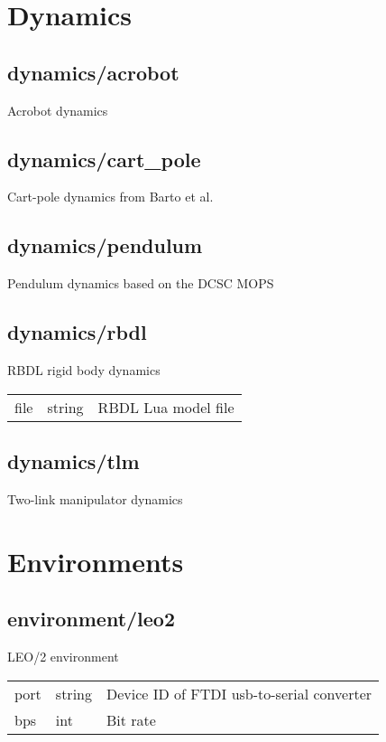 \section{Dynamics}
\subsection{dynamics/acrobot}
\noindent Acrobot dynamics\\

\subsection{dynamics/cart\_pole}
\noindent Cart-pole dynamics from Barto et al.\\

\subsection{dynamics/pendulum}
\noindent Pendulum dynamics based on the DCSC MOPS\\

\subsection{dynamics/rbdl}
\noindent RBDL rigid body dynamics\\

\noindent\begin{tabular}{@{}lll@{}}
file&string&RBDL Lua model file\\
\end{tabular}
\subsection{dynamics/tlm}
\noindent Two-link manipulator dynamics\\

\section{Environments}
\subsection{environment/leo2}
\noindent LEO/2 environment\\

\noindent\begin{tabular}{@{}lll@{}}
port&string&Device ID of FTDI usb-to-serial converter\\
bps&int&Bit rate\\
\end{tabular}
\\

